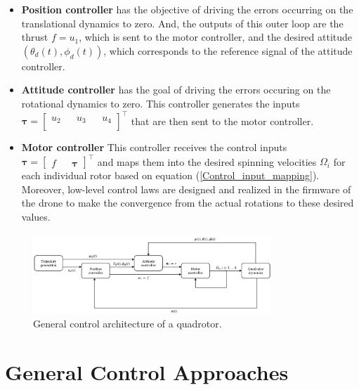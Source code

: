 \documentclass{thesisreport}
\begin{document}
\begin{itemize}
	\setlength{\itemindent}{-.5in}
	\item [] \textbf{Position controller} has the objective of driving the errors occurring on the translational dynamics to zero.
		And, the outputs of this outer loop are the thrust $f=u_1$, which is sent to the motor controller, and the desired attitude $(\theta_d(t),\phi_d(t))$, which corresponds to the reference signal of the attitude controller.
	\item [] \textbf{Attitude controller} has the goal of driving the errors occuring on the rotational dynamics to zero. This controller generates the inputs 
	$\bm{\tau}=\begin{bmatrix}
	u_2 && u_3 && u_4 \\
	\end{bmatrix}^{\intercal}
	$
	that are then sent to the motor controller.
	\item [] \textbf{Motor controller} This controller receives the control inputs 	$\bm{\tau}=\begin{bmatrix}
	f && \bm{\tau}
	\end{bmatrix}^{\intercal}
	$ and maps them into the desired spinning velocities $\Omega_i$ for each individual rotor based on equation (\ref{Control_input_mapping}). Moreover, low-level control laws are designed and realized in the firmware of the drone to make the convergence from the actual rotations to these desired values.
\end{itemize}
 

 
 \begin{figure}[h]
 \centering
 \includegraphics[width=0.8\textwidth]{Images/Control/General_control_architecture}
 \caption{General control architecture of a quadrotor.}
 \label{General_control_architecture}
 \end{figure}
 
 
 
 \newpage 
 \section{General Control Approaches}\label{control_approaches_for_multi_flip_maneuvers}
\end{document}

